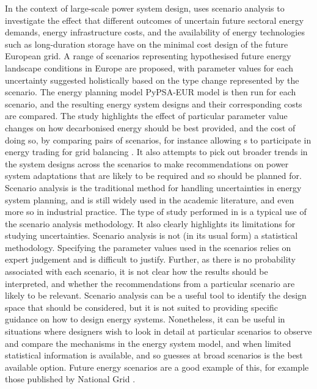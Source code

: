 In the context of large-scale power system design,  uses scenario analysis to investigate the effect that different outcomes of uncertain future sectoral energy demands, energy infrastructure costs, and the availability of energy technologies such as long-duration storage have on the minimal cost design of the future European grid. A range of scenarios representing hypothesised future energy landscape conditions in Europe are proposed, with parameter values for each uncertainty suggested holistically based on the type change represented by the scenario. The energy planning model PyPSA-EUR model  is then run for each scenario, and the resulting energy system designs and their corresponding costs are compared. The study highlights the effect of particular parameter value changes on how decarbonised energy should be best provided, and the cost of doing so, by comparing pairs of scenarios, for instance allowing s to participate in energy trading for grid balancing . It also attempts to pick out broader trends in the system designs across the scenarios to make recommendations on power system adaptations that are likely to be required and so should be planned for. Scenario analysis is the traditional method for handling uncertainties in energy system planning, and is still widely used in the academic literature, and even more so in industrial practice. The type of study performed in  is a typical use of the scenario analysis methodology. It also clearly highlights its limitations for studying uncertainties. Scenario analysis is not (in its usual form) a statistical methodology. Specifying the parameter values used in the scenarios relies on expert judgement and is difficult to justify. Further, as there is no probability associated with each scenario, it is not clear how the results should be interpreted, and whether the recommendations from a particular scenario are likely to be relevant. Scenario analysis can be a useful tool to identify the design space that should be considered, but it is not suited to providing specific guidance on how to design energy systems. Nonetheless, it can be useful in situations where designers wish to look in detail at particular scenarios to observe and compare the mechanisms in the energy system model, and when limited statistical information is available, and so guesses at broad scenarios is the best available option. Future energy scenarios are a good example of this, for example those published by National Grid .

